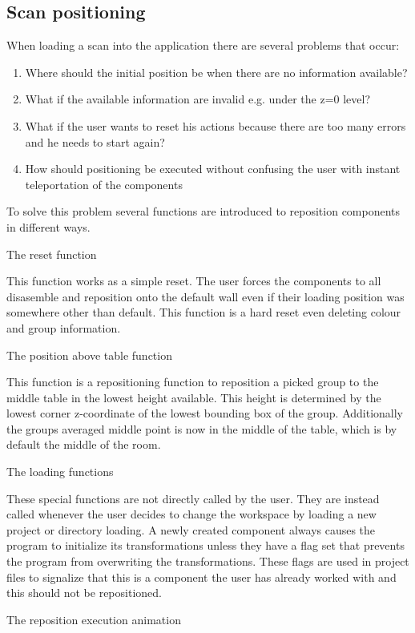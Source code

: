 \documentclass[hyperref,english,bachelorofscience,bibnum]{cgvpub}
\begin{document}
\subsection{Scan positioning}

When loading a scan into the application there are several problems that occur:
\begin{enumerate}
\item Where should the initial position be when there are no information available?
\item What if the available information are invalid e.g. under the z=0 level?
\item What if the user wants to reset his actions because there are too many errors and he needs to start again?
\item How should positioning be executed without confusing the user with instant teleportation of the components
\end{enumerate}
To solve this problem several functions are introduced to reposition components in different ways.


 The reset function

This function works as a simple reset. The user forces the components to all disasemble and reposition onto the default wall even if their loading position was somewhere other than default. This function is a hard reset even deleting colour and group information.

The position above table function

This function is a repositioning function to reposition a picked group to the middle table in the lowest height available. This height is determined by the lowest corner z-coordinate of the lowest bounding box of the group. Additionally the groups averaged middle point is now in the middle of the table, which is by default the middle of the room.

The loading functions

These special functions are not directly called by the user. They are instead called whenever the user decides to change the workspace by loading a new project or directory loading. A newly created component always causes the program to initialize its transformations unless they have a flag set that prevents the program from overwriting the transformations. These flags are used in project files to signalize that this is a component the user has already worked with and this should not be repositioned.

The reposition execution animation
\end{document}
